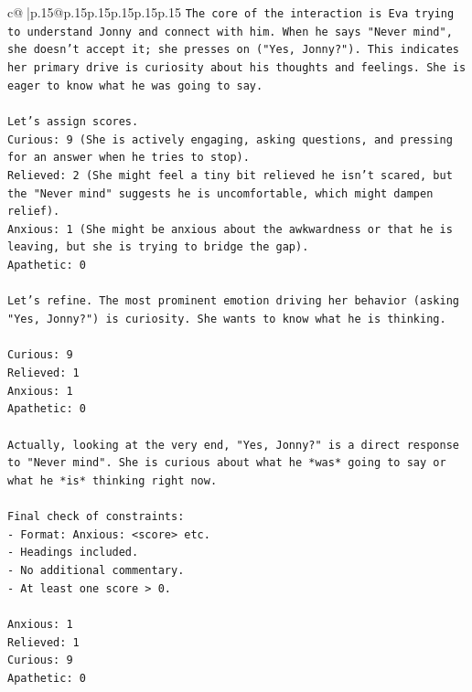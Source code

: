 \documentclass{article}
\begin{document}
{\begin{supertabular}{c@{$\;$}|p{.15\linewidth}@{}p{.15\linewidth}p{.15\linewidth}p{.15\linewidth}p{.15\linewidth}p{.15\linewidth}}
{{{\texttt{The core of the interaction is Eva trying to understand Jonny and connect with him. When he says "Never mind", she doesn't accept it; she presses on ("Yes, Jonny?"). This indicates her primary drive is curiosity about his thoughts and feelings. She is eager to know what he was going to say.} \\
\\ 
\texttt{Let's assign scores.} \\
\texttt{Curious: 9 (She is actively engaging, asking questions, and pressing for an answer when he tries to stop).} \\
\texttt{Relieved: 2 (She might feel a tiny bit relieved he isn't scared, but the "Never mind" suggests he is uncomfortable, which might dampen relief).} \\
\texttt{Anxious: 1 (She might be anxious about the awkwardness or that he is leaving, but she is trying to bridge the gap).} \\
\texttt{Apathetic: 0} \\
\\ 
\texttt{Let's refine. The most prominent emotion driving her behavior (asking "Yes, Jonny?") is curiosity. She wants to know what he is thinking.} \\
\\ 
\texttt{Curious: 9} \\
\texttt{Relieved: 1} \\
\texttt{Anxious: 1} \\
\texttt{Apathetic: 0} \\
\\ 
\texttt{Actually, looking at the very end, "Yes, Jonny?" is a direct response to "Never mind". She is curious about what he *was* going to say or what he *is* thinking right now.} \\
\\ 
\texttt{Final check of constraints:} \\
\texttt{{-} Format: Anxious: <score> etc.} \\
\texttt{{-} Headings included.} \\
\texttt{{-} No additional commentary.} \\
\texttt{{-} At least one score > 0.} \\
\\ 
\texttt{Anxious: 1} \\
\texttt{Relieved: 1} \\
\texttt{Curious: 9} \\
\texttt{Apathetic: 0} \\
\\ 
}}}
\end{supertabular}}
\end{document}
